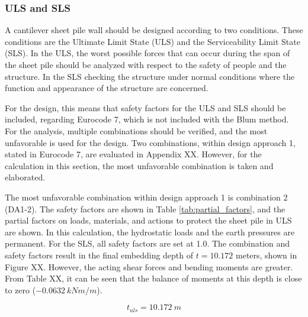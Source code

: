 \subsubsection{ULS and SLS}

A cantilever sheet pile wall should be designed according to two conditions. These conditions are the Ultimate Limit State (ULS) and the Serviceability Limit State (SLS). In the ULS, the worst possible forces that can occur during the span of the sheet pile should be analyzed with respect to the safety of people and the structure. In the SLS checking the structure under normal conditions where the function and appearance of the structure are concerned.

For the design, this means that safety factors for the ULS and SLS should be included, regarding Eurocode 7, which is not included with the Blum method. For the analysis, multiple combinations should be verified, and the most unfavorable is used for the design. Two combinations, within design approach 1, stated in Eurocode 7, are evaluated in Appendix XX. However, for the calculation in this section, the most unfavorable combination is taken and elaborated.

The most unfavorable combination within design approach 1 is combination 2 (DA1-2). The safety factors are shown in Table \ref{tab:partial_factors}, and the partial factors on loads, materials, and actions to protect the sheet pile in ULS are shown. In this calculation, the hydrostatic loads and the earth pressures are permanent. For the SLS, all safety factors are set at 1.0. The combination and safety factors result in the final embedding depth of $t = 10.172$ meters,  shown in Figure XX. However, the acting shear forces and bending moments are greater. From Table XX, it can be seen that the balance of moments at this depth is close to zero ($-0.0632 \ kNm/m$).


\begin{equation}
    t_{uls} = 10.172 \ m
\end{equation}

